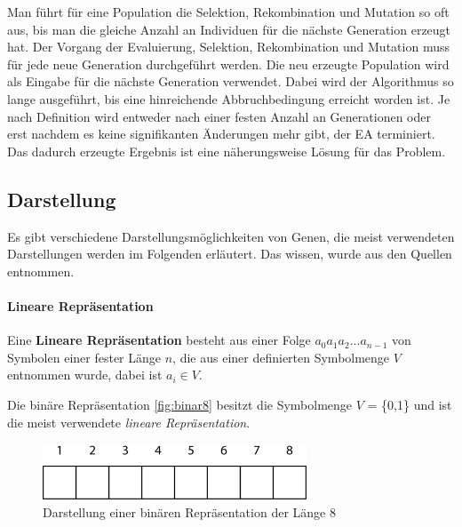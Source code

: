 Man f{\"u}hrt f{\"u}r eine Population die Selektion, Rekombination und Mutation so oft aus, bis man die gleiche Anzahl an Individuen f{\"u}r die n{\"a}chste Generation erzeugt hat.
Der Vorgang der Evaluierung, Selektion, Rekombination und Mutation muss f{\"u}r jede neue Generation durchgef{\"u}hrt werden. 
Die neu erzeugte Population wird als Eingabe f{\"u}r die nächste Generation verwendet. 
Dabei wird der Algorithmus so lange ausgef{\"u}hrt, bis eine hinreichende Abbruchbedingung erreicht worden ist. 
Je nach Definition wird entweder nach einer festen Anzahl an Generationen oder erst nachdem es keine signifikanten {\"A}nderungen mehr gibt, der EA terminiert.
Das dadurch erzeugte Ergebnis ist eine n{\"a}herungsweise L{\"o}sung f{\"u}r das Problem.

\subsection{Darstellung}
Es gibt verschiedene Darstellungsm{\"o}glichkeiten von Genen, die meist verwendeten Darstellungen werden im Folgenden erläutert. 
Das wissen, wurde aus den Quellen \cite{flickevolutionare, shiffman2012nature, DillmannZoeller2017} entnommen.

\paragraph{Lineare Repr{\"a}sentation}
Eine \textbf{Lineare Repr{\"a}sentation} besteht aus einer Folge $a_{0}a_{1}a_{2}...a_{n-1}$ von Symbolen einer fester L{\"a}nge $n$, die aus einer definierten Symbolmenge $V$ entnommen wurde, dabei ist $a_{i} \in V$.   

Die bin{\"a}re Repr{\"a}sentation \autoref{fig:binar8} besitzt die Symbolmenge $V$ = \{0,1\} und ist die meist verwendete \textit{lineare Repr{\"a}sentation}. 

\begin{figure}
	\centering
    \includegraphics[width=0.7\textwidth]{pics/grundlage/binar8.png}
    \caption{Darstellung einer binären Repräsentation der Länge 8}
    \label{fig:binar8}
\end{figure}


